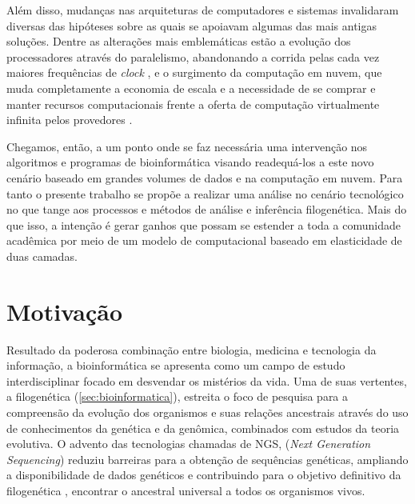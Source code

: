 \documentclass[english,brazilian]{UNISINOSmonografia} %
\begin{document}


Além disso, mudanças nas arquiteturas de computadores e sistemas invalidaram diversas das hipóteses sobre as quais se apoiavam algumas das mais antigas soluções.
Dentre as alterações mais emblemáticas estão a evolução dos processadores através do paralelismo, abandonando a corrida pelas cada vez maiores frequências de \textit{clock} \cite{Baker1999}, e o surgimento da computação em nuvem, que muda completamente a economia de escala e a necessidade de se comprar e manter recursos computacionais frente a oferta de computação virtualmente infinita pelos provedores \cite{NIST}.


Chegamos, então, a um ponto onde se faz necessária uma intervenção nos algoritmos e programas de bioinformática visando readequá-los a este novo cenário baseado em grandes volumes de dados e na computação em nuvem.
Para tanto o presente trabalho se propõe a realizar uma análise no cenário tecnológico no que tange aos processos e métodos de análise e inferência filogenética.
Mais do que isso, a intenção é gerar ganhos que possam se estender a toda a comunidade acadêmica por meio de um modelo de computacional baseado em elasticidade de duas camadas.



\section{Motivação}



Resultado da poderosa combinação entre biologia, medicina e tecnologia da informação, a bioinformática se apresenta como um campo de estudo interdisciplinar focado em desvendar os mistérios da vida.
Uma de suas vertentes, a filogenética (\autoref{sec:bioinformatica}), estreita o foco de pesquisa para a compreensão da evolução dos organismos e suas relações ancestrais através do uso de conhecimentos da genética e da genômica, combinados com estudos da teoria evolutiva.
O advento das tecnologias chamadas de NGS, (\textit{Next Generation Sequencing}) reduziu barreiras para a obtenção de sequências genéticas, ampliando a disponibilidade de dados genéticos e contribuindo para o objetivo definitivo da filogenética \cite{book:2119998,yang2014molecular}, encontrar o ancestral universal a todos os organismos vivos.


\end{document}

